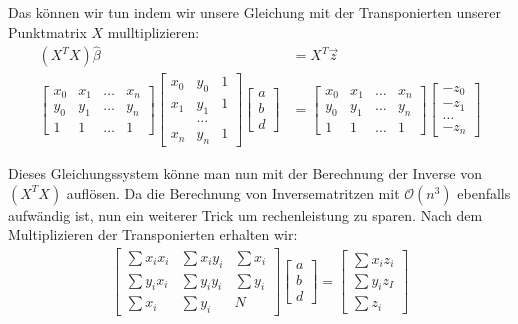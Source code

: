 \documentclass[11pt,oneside,openright]{mpreport}
\begin{document}
Das können wir tun indem wir unsere Gleichung mit der Transponierten unserer Punktmatrix $X$ mulltiplizieren:
\begin{align*}
(X^TX) \hat{\beta} &= X^T \vec{z}\\
\begin{bmatrix}
x_0 & x_1 & \dots & x_n \\
y_0 & y_1 & \dots & y_n \\
1 & 1 & \dots & 1  
\end{bmatrix} 
\begin{bmatrix}
x_0 & y_0 & 1 \\
x_1 & y_1 & 1 \\
 & \dots & \\
x_n & y_n & 1 
\end{bmatrix} 
\begin{bmatrix}
a \\
b \\
d 
\end{bmatrix} 
 &= 
\begin{bmatrix}
x_0 & x_1 & \dots & x_n \\
y_0 & y_1 & \dots & y_n \\
1 & 1 & \dots & 1  
\end{bmatrix} 
\begin{bmatrix}
-z_0 \\
-z_1 \\
\dots \\
-z_n 
\end{bmatrix} 
\end{align*}

Dieses Gleichungssystem könne man nun mit der Berechnung der Inverse von $(X^TX)$ auflösen. Da die Berechnung von Inversematritzen mit $\mathcal{O}(n^3)$ ebenfalls aufwändig ist,
nun ein weiterer Trick um rechenleistung zu sparen.
Nach dem Multiplizieren der Transponierten erhalten wir:
\begin{align*}
\begin{bmatrix}
\sum x_i x_i & \sum x_i y_i & \sum x_i \\
\sum y_i x_i & \sum y_i y_i & \sum y_i \\
\sum x_i & \sum y_i & N
\end{bmatrix} 
\begin{bmatrix}
a \\
b \\
d 
\end{bmatrix} 
 = 
\begin{bmatrix}
\sum x_i z_i \\
\sum y_i z_I \\
\sum z_i 
\end{bmatrix} 
\end{align*}
\end{document}
